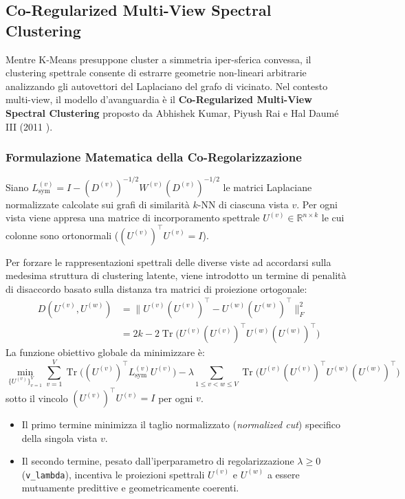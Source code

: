 \FloatBarrier
\subsection{Co-Regularized Multi-View Spectral Clustering}
\label{subsec:lab-coreg-spectral}

Mentre K-Means presuppone cluster a simmetria iper-sferica convessa, il clustering spettrale consente di estrarre geometrie non-lineari arbitrarie analizzando gli autovettori del Laplaciano del grafo di vicinato. Nel contesto multi-view, il modello d'avanguardia è il \textbf{Co-Regularized Multi-View Spectral Clustering} proposto da Abhishek Kumar, Piyush Rai e Hal Daum{\'e} III (2011 \cite{kumar2011}).

\subsubsection{Formulazione Matematica della Co-Regolarizzazione}
Siano $L_{\text{sym}}^{(v)} = I - (D^{(v)})^{-1/2} W^{(v)} (D^{(v)})^{-1/2}$ le matrici Laplaciane normalizzate calcolate sui grafi di similarità $k$-NN di ciascuna vista $v$. Per ogni vista viene appresa una matrice di incorporamento spettrale $U^{(v)} \in \mathbb{R}^{n \times k}$ le cui colonne sono ortonormali ($(U^{(v)})^\top U^{(v)} = I$).

Per forzare le rappresentazioni spettrali delle diverse viste ad accordarsi sulla medesima struttura di clustering latente, viene introdotto un termine di penalità di disaccordo basato sulla distanza tra matrici di proiezione ortogonale:
\begin{align}
    D(U^{(v)}, U^{(w)}) &= \| U^{(v)}(U^{(v)})^\top - U^{(w)}(U^{(w)})^\top \|_F^2 \nonumber \\
    &= 2k - 2 \operatorname{Tr}\big( U^{(v)}(U^{(v)})^\top U^{(w)}(U^{(w)})^\top \big)
\end{align}
La funzione obiettivo globale da minimizzare è:
\begin{equation}
    \min_{\{U^{(v)}\}_{v=1}^V} \sum_{v=1}^V \operatorname{Tr}\Big( (U^{(v)})^\top L_{\text{sym}}^{(v)} U^{(v)} \Big) - \lambda \sum_{1 \le v < w \le V} \operatorname{Tr}\Big( U^{(v)}(U^{(v)})^\top U^{(w)}(U^{(w)})^\top \Big)
    \label{eq:coreg-spectral-objective}
\end{equation}
sotto il vincolo $(U^{(v)})^\top U^{(v)} = I$ per ogni $v$.
\begin{itemize}
    \item Il primo termine minimizza il taglio normalizzato (\textit{normalized cut}) specifico della singola vista $v$.
    \item Il secondo termine, pesato dall'iperparametro di regolarizzazione $\lambda \ge 0$ (\texttt{v\_lambda}), incentiva le proiezioni spettrali $U^{(v)}$ e $U^{(w)}$ a essere mutuamente predittive e geometricamente coerenti.
\end{itemize}

